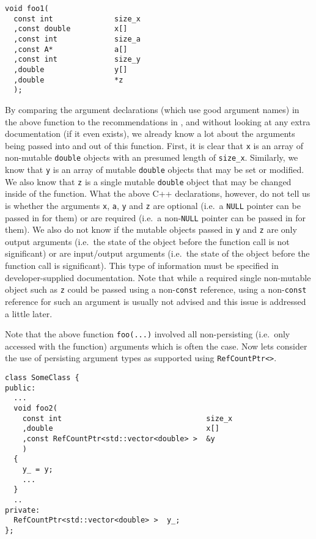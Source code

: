 {\scriptsize\begin{verbatim}
void foo1(
  const int              size_x
  ,const double          x[]
  ,const int             size_a
  ,const A*              a[]
  ,const int             size_y
  ,double                y[]
  ,double                *z
  );
\end{verbatim}}

By comparing the argument declarations (which use good argument names)
in the above function to the recommendations in {}\cite[Appendix
D]{ref:RefCountPtrBeginnersGuide}, and without looking at any extra
documentation (if it even exists), we already know a lot about the
arguments being passed into and out of this function.  First, it is
clear that {}\texttt{x} is an array of non-mutable {}\texttt{double}
objects with an presumed length of {}\texttt{size\_x}.  Similarly, we
know that {}\texttt{y} is an array of mutable {}\texttt{double}
objects that may be set or modified.  We also know that {}\texttt{z}
is a single mutable {}\texttt{double} object that may be changed
inside of the function.  What the above C++ declarations, however, do
not tell us is whether the arguments {}\texttt{x}, {}\texttt{a},
{}\texttt{y} and {}\texttt{z} are optional (i.e.~a {}\texttt{NULL}
pointer can be passed in for them) or are required (i.e.~a
non-{}\texttt{NULL} pointer can be passed in for them).  We also do
not know if the mutable objects passed in {}\texttt{y} and
{}\texttt{z} are only output arguments (i.e.~the state of the object
before the function call is not significant) or are input/output
arguments (i.e.~the state of the object before the function call is
significant).  This type of information must be specified in
developer-supplied documentation.  Note that while a required single
non-mutable object such as {}\texttt{z} could be passed using a
non-{}\texttt{const} reference, using a non-{}\texttt{const} reference
for such an argument is usually not advised and this issue is
addressed a little later.

Note that the above function {}\texttt{foo(...)} involved all
non-persisting (i.e.~only accessed with the function) arguments which is
often the case.  Now lets consider the use of persisting argument
types as supported using {}\texttt{Ref\-Count\-Ptr<>}.

{\scriptsize\begin{verbatim}
class SomeClass {
public:
  ...
  void foo2(
    const int                                 size_x
    ,double                                   x[]
    ,const RefCountPtr<std::vector<double> >  &y
    )
  {
    y_ = y;
    ...
  }
  ..
private:
  RefCountPtr<std::vector<double> >  y_;
};
\end{verbatim}}

